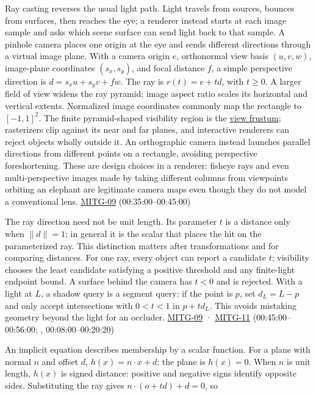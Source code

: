 Ray casting reverses the usual light path. Light travels from sources, bounces from surfaces, then reaches the eye; a renderer instead starts at each image sample and asks which scene surface can send light back to that sample. A pinhole camera places one origin at the eye and sends different directions through a virtual image plane. With a camera origin \(e\), orthonormal view basis \((u,v,w)\), image-plane coordinates \((s_x,s_y)\), and focal distance \(f\), a simple perspective direction is \(d=s_xu+s_yv+fw\). The ray is \(r(t)=e+td\), with \(t\geq 0\). A larger field of view widens the ray pyramid; image aspect ratio scales its horizontal and vertical extents. Normalized image coordinates commonly map the rectangle to \([-1,1]^2\). The finite pyramid-shaped visibility region is the \hyperref[appendix-1c07d64f5e70]{view frustum}; rasterizers clip against its near and far planes, and interactive renderers can reject objects wholly outside it. An orthographic camera instead launches parallel directions from different points on a rectangle, avoiding perspective foreshortening. These are design choices in a renderer: fisheye rays and even multi-perspective images made by taking different columns from viewpoints orbiting an elephant are legitimate camera maps even though they do not model a conventional lens. \hyperref[04-visual-computing-ii-ch036-mitg-09---ray-casting]{MITG-09} (00:35:00--00:45:00)

The ray direction need not be unit length. Its parameter \(t\) is a distance only when \(\|d\|=1\); in general it is the scalar that places the hit on the parameterized ray. This distinction matters after transformations and for comparing distances. For one ray, every object can report a candidate \(t\); visibility chooses the least candidate satisfying a positive threshold and any finite-light endpoint bound. A surface behind the camera has \(t<0\) and is rejected. With a light at \(L\), a shadow query is a segment query: if the point is \(p\), set \(d_L=L-p\) and only accept intersections with \(0<t<1\) in \(p+td_L\). This avoids mistaking geometry beyond the light for an occluder. \hyperref[04-visual-computing-ii-ch036-mitg-09---ray-casting]{MITG-09} · \hyperref[04-visual-computing-ii-ch036-mitg-11---ray-tracing]{MITG-11} (00:45:00--00:56:00; , 00:08:00--00:20:20)

An implicit equation describes membership by a scalar function. For a plane with normal \(n\) and offset \(d\), \(h(x)=n\cdot x+d\); the plane is \(h(x)=0\). When \(n\) is unit length, \(h(x)\) is signed distance: positive and negative signs identify opposite sides. Substituting the ray gives \(n\cdot(o+td)+d=0\), so

